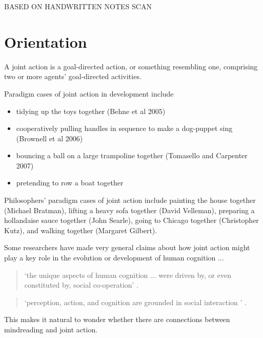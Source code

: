 \documentclass[12pt,a4paper]{extarticle}
\begin{document}
\setlength\footnotesep{1em}


\maketitle

BASED ON  HANDWRITTEN NOTES SCAN

\section{Orientation}
A joint action is a goal-directed action, or something resembling one, comprising two or more agents' goal-directed activities. 

Paradigm cases of joint action in development include
%
\begin{itemize}
\item tidying up the toys together 
(Behne et al 2005)
\item cooperatively pulling handles in sequence to make a dog-puppet sing 
(Brownell et al 2006)
\item bouncing a ball on a large trampoline together 
(Tomasello and Carpenter 2007)
\item pretending to row a boat together
\end{itemize}
%
Philosophers' paradigm cases of joint action include painting the house together (Michael Bratman), lifting a heavy sofa together (David Velleman), preparing a hollandaise sauce together (John Searle), going to Chicago together (Christopher Kutz), and walking together (Margaret Gilbert).

Some researchers have made very general claims about how  joint action might play a key role in the evolution or development of human cognition ...
%
\begin{quote} 
`the unique aspects of human cognition ... were driven by, or even constituted by, social co-operation'
\citep[p.\ 1]{Moll:2007gu}.
\end{quote}
%
\begin{quote} 
`perception, action, and cognition are grounded in social interaction%
' \citep[p.\ 103]{Knoblich:2006bn}.
\end{quote}
%
This makes it natural to wonder whether there are connections between mindreading and joint action.
\end{document}
